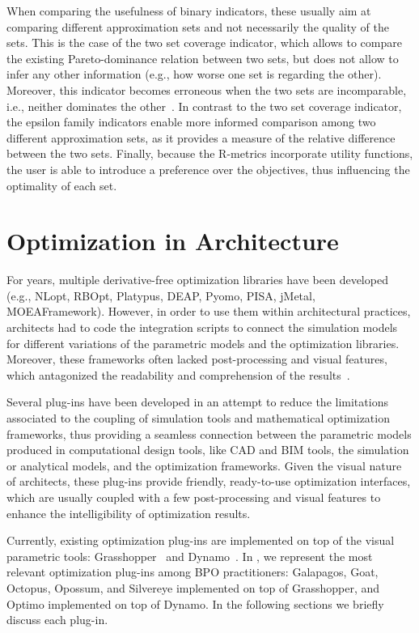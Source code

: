 	When comparing the usefulness of binary indicators, these usually aim at comparing different approximation sets and not necessarily the quality of the sets. This is the case of the two set coverage indicator, which allows to compare the existing Pareto-dominance relation between two sets, but does not allow to infer any other information (e.g., how worse one set is regarding the other). Moreover, this indicator becomes erroneous when the two sets are incomparable, i.e., neither dominates the other~\cite{Zitzler2003Metrics}. In contrast to the two set coverage indicator, the epsilon family indicators enable more informed comparison among two different approximation sets, as it provides a measure of the relative difference between the two sets. Finally, because the R-metrics incorporate utility functions, the user is able to introduce a preference over the objectives, thus influencing the optimality of each set. 

	
	
	
\section{Optimization in Architecture}
	
	
	\label{sec:plugins}
	
	For years, multiple derivative-free optimization libraries have been developed (e.g., NLopt, RBOpt, Platypus, DEAP, Pyomo, PISA, jMetal, MOEAFramework). However, in order to use them within architectural practices, architects had to code the integration scripts to connect the simulation models for different variations of the parametric models and the optimization libraries\cite{Attia2013}. Moreover, these frameworks often lacked post-processing and visual features, which antagonized the readability and comprehension of the results~\cite{Attia2013,Nguyen2014}.
	
	Several plug-ins have been developed in an attempt to reduce the limitations associated to the coupling of simulation tools and mathematical optimization frameworks, thus providing a seamless connection between the parametric models produced in computational design tools, like \ac{CAD} and \ac{BIM} tools, the simulation or analytical models, and the optimization frameworks. Given the visual nature of architects, these plug-ins provide friendly, ready-to-use optimization interfaces, which are usually coupled with a few post-processing and visual features to enhance the intelligibility of optimization results. 
	
	Currently, existing optimization plug-ins are implemented on top of the visual parametric tools: Grasshopper~\cite{GRASSHOPPER} and Dynamo~\cite{DYNAMOBIM}. In , we represent the most relevant optimization plug-ins among \ac{BPO} practitioners: Galapagos, Goat, Octopus, Opossum, and Silvereye implemented on top of Grasshopper, and Optimo implemented on top of Dynamo. In the following sections we briefly discuss each plug-in.
	
